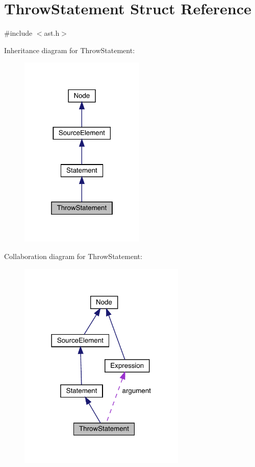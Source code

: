 \hypertarget{struct_throw_statement}{}\section{Throw\+Statement Struct Reference}
\label{struct_throw_statement}


{\ttfamily \#include $<$ast.\+h$>$}



Inheritance diagram for Throw\+Statement\+:
\nopagebreak
\begin{figure}[H]
\begin{center}
\leavevmode
\includegraphics[width=169pt]{struct_throw_statement__inherit__graph}
\end{center}
\end{figure}


Collaboration diagram for Throw\+Statement\+:
\nopagebreak
\begin{figure}[H]
\begin{center}
\leavevmode
\includegraphics[width=226pt]{struct_throw_statement__coll__graph}
\end{center}
\end{figure}
